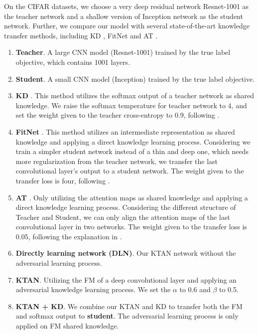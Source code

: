 \documentclass[letterpaper]{article} %
\begin{document}
On the CIFAR datasets, we choose a very deep residual network Resnet-1001 \cite{he2016identity} as the teacher network and a shallow version of Inception network \cite{ioffe2015batch} as the student network. Further, we compare our model with several state-of-the-art knowledge transfer methods, including KD \cite{hinton2015distilling}, FitNet \cite{romero2014fitnets} and AT \cite{zagoruyko2016paying}.

\begin{enumerate}[(1)]
	\item \textbf{Teacher}. A large CNN model (Resnet-1001) trained by the true label objective, which contains 1001 layers.
	\item \textbf{Student}. A small CNN model (Inception) trained by the true label objective.
	\item \textbf{KD} \cite{hinton2015distilling}. This method utilizes the softmax output of a teacher network as shared knowledge. We raise the softmax temperature for teacher network to 4, and set the weight given to the teacher cross-entropy to 0.9, following \cite{hinton2015distilling}.
	\item \textbf{FitNet} \cite{romero2014fitnets}. This method utilizes an intermediate representation as shared knowledge and applying a direct knowledge learning process. Considering we train a simpler student network instead of a thin and deep one, which needs more regularization from the teacher network, we transfer the last convolutional layer's output to a student network. The weight given to the transfer loss is four, following \cite{romero2014fitnets}.
	\item \textbf{AT} \cite{zagoruyko2016paying}. Only utilizing the attention maps as shared knowledge and applying a direct knowledge learning process. Considering the different structure of Teacher and Student, we can only align the attention maps of the last convolutional layer in two networks. The weight given to the transfer loss is 0.05, following the explanation in \cite{zagoruyko2016paying}.
	\item \textbf{Directly learning network (DLN)}. Our KTAN network without the adversarial learning process.
	\item 	\textbf{KTAN}. Utilizing the FM of a deep convolutional layer and applying an adversarial knowledge learning process. We set the $\alpha$ to 0.6 and $\beta$ to 0.5.
	\item \textbf{KTAN + KD}. We combine our KTAN and KD to transfer both the FM and softmax output to \textbf{student}. The adversarial learning process is only applied on FM shared knowledge.
\end{enumerate}
\end{document}
